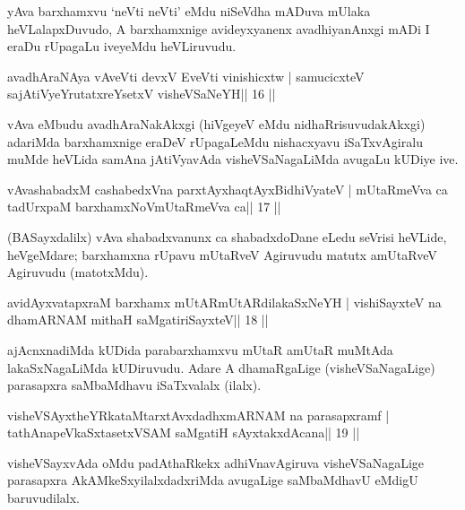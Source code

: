\begin{artha}
yAva barxhamxvu `neVti neVti' eMdu niSeVdha mADuva mUlaka heVLalapxDuvudo, A barxhamxnige avideyxyanenx avadhiyanAnxgi mADi I eraDu rUpagaLu iveyeMdu heVLiruvudu.
\end{artha}



\begin{shl}
avadhAraNAya vAveVti devxV EveVti vinishicxtw |
samucicxteV sajAtiVyeYrutatxreYsetxV visheVSaNeYH\hfill || 16 ||
\end{shl}

\begin{artha}
vAva eMbudu avadhAraNakAkxgi (hiVgeyeV eMdu nidhaRrisuvudakAkxgi) adariMda barxhamxnige eraDeV rUpagaLeMdu nishacxyavu iSaTxvAgiralu muMde heVLida samAna jAtiVyavAda visheVSaNagaLiMda avugaLu kUDiye ive.
\end{artha}

\begin{shl}
vAvashabadxM cashabedxVna parxtAyxhaqtAyxBidhiVyateV |
mUtaRmeVva ca tadUrxpaM barxhamxNoV\s mUtaRmeVva ca\hfill || 17 ||
\end{shl}

\begin{artha}
(BASayxdalilx) vAva shabadxvanunx ca shabadxdoDane eLedu seVrisi   heVLide, heVgeMdare; barxhamxna rUpavu mUtaRveV Agiruvudu matutx amUtaRveV Agiruvudu (matotxMdu).
\end{artha}

\begin{shl}
avidAyxvatapxraM barxhamx mUtARmUtARdilakaSxNeYH |
vishiSayxteV na dhamARNAM mithaH saMgatiriSayxteV\hfill || 18 ||
\end{shl}

\begin{artha}
ajAcnxnadiMda kUDida parabarxhamxvu mUtaR amUtaR muMtAda
lakaSxNagaLiMda kUDiruvudu. Adare A dhamaRgaLige (visheVSaNagaLige)
parasapxra saMbaMdhavu iSaTxvalalx (ilalx). 
\end{artha}



\begin{shl}
visheVSAyxtheYRkataMtarxtAvxdadhxmARNAM na parasapxramf |
tathA\s napeVkaSxtasetxVSAM saMgatiH sAyxtakxdAcana\hfill || 19 ||
\end{shl}

\begin{artha}
visheVSayxvAda oMdu padAthaRkekx adhiVnavAgiruva visheVSaNagaLige parasapxra AkAMkeSxyilalxdadxriMda avugaLige saMbaMdhavU eMdigU baruvudilalx.
\end{artha}


